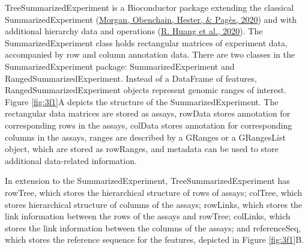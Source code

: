 \documentclass[12pt,twoside]{reedthesis}
\begin{document}
TreeSummarizedExperiment is a Bioconductor package extending the
classical SummarizedExperiment (\protect\hyperlink{ref-morgan2020}{Morgan, Obenchain, Hester, \& Pagès, 2020}) and with additional
hierarchy data and operations (\protect\hyperlink{ref-huang2020}{R. Huang et al., 2020}). The SummarizedExperiment
class holds rectangular matrices of experiment data, accompanied by row
and column annotation data. There are two classes in the
SummarizedExperiment package: SummarizedExperiment and
RangedSummarizedExperiment. Instead of a DataFrame of features,
RangedSummarizedExperiment objects represent genomic ranges of interest.
Figure \ref{fig:3f1}A depicts the structure of the SummarizedExperiment. The
rectangular data matrices are stored as assays, rowData stores
annotation for corresponding rows in the assays, colData stores
annotation for corresponding columns in the assays, ranges are described
by a GRanges or a GRangesList object, which are stored as rowRanges, and
metadata can be used to store additional data-related information.

In extension to the SummarizedExperiment, TreeSummarizedExperiment has
rowTree, which stores the hierarchical structure of rows of assays;
colTree, which stores hierarchical structure of columns of the assays;
rowLinks, which stores the link information between the rows of the
assays and rowTree; colLinks, which stores the link information between
the columns of the assays; and referenceSeq, which stores the reference
sequence for the features, depicted in Figure \ref{fig:3f1}B.
\end{document}

